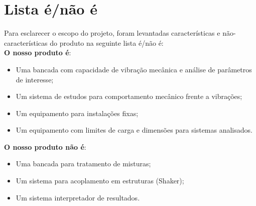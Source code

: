 \chapter{Lista é/não é}
	\label{enaoe}
%     


Para esclarecer o escopo do projeto, foram levantadas características e não-características do produto na seguinte lista é/não é:\\

\textbf{O nosso produto é}:
\begin{itemize}
  \item Uma bancada com capacidade de vibração mecânica e análise de parâmetros de interesse;
  \item Um sistema de estudos para comportamento mecânico frente a vibrações;
  \item Um equipamento para instalações fixas;
  \item Um equipamento com limites de carga e dimensões para sistemas analisados.
\end{itemize}

\textbf{O nosso produto não é}:
\begin{itemize}
  \item Uma bancada para tratamento de misturas;
  \item Um sistema para acoplamento em estruturas (Shaker);
  \item Um sistema interpretador de resultados.
\end{itemize}


